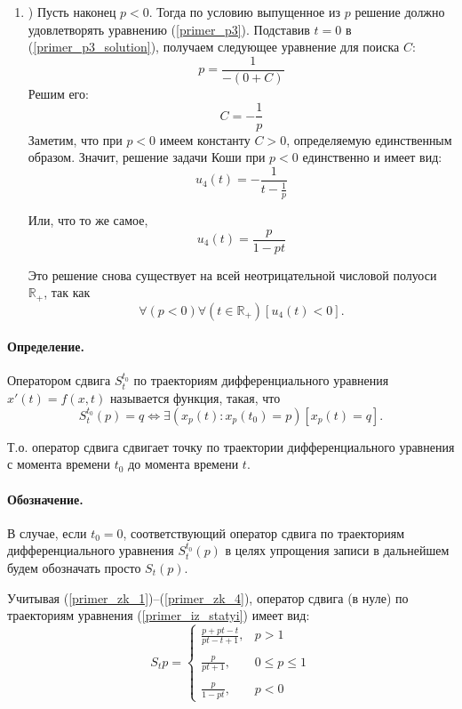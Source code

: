 \begin{enumerate}
\item)
Пусть наконец $p<0$.
Тогда по условию выпущенное из $p$ решение должно удовлетворять уравнению (\ref{primer_p3}).
Подставив $t=0$ в (\ref{primer_p3_solution}), получаем следующее уравнение для поиска $C$:
$$
	p=\frac{1}{-(0+C)}
$$
Решим его:
$$
	C=-\frac{1}{p}
$$
Заметим, что при $p<0$ имеем константу $C>0$, определяемую единственным образом.
Значит, решение задачи Коши при $p<0$ единственно и имеет вид:
\begin{equation}\label{primer_zk_4_0}
	u_4(t)=-\frac{1}{t-\frac{1}{p}}
\end{equation}

Или, что то же самое,
\begin{equation}\label{primer_zk_4}
	u_4(t)=\frac{p}{1-pt}
\end{equation}

Это решение снова существует на всей неотрицательной числовой полуоси $\mathbb{R}_+$, так как
$$
	\forall(p<0)\forall\left(t \in \mathbb{R}_+\right)\left[u_4(t) < 0\right].
$$

\end{enumerate}

\paragraph{Определение.}
Оператором сдвига $S^{t_0}_t$ по траекториям дифференциального уравнения $x'(t) = f(x,t)$ называется функция, такая, что
\begin{equation*}
	S^{t_0}_t (p) = q \Leftrightarrow
		\exists\left(x_p(t) : x_p(t_0) = p\right)\left[x_p(t) = q\right].
\end{equation*}

Т.о. оператор сдвига сдвигает точку по траектории дифференциального уравнения с момента времени $t_0$ до момента времени $t$.

\paragraph{Обозначение.}
В случае, если $t_0=0$, соответствующий оператор сдвига по траекториям дифференциального уравнения $S^{t_0}_t (p)$ в целях упрощения записи  в дальнейшем будем обозначать просто $S_t (p)$.

Учитывая (\ref{primer_zk_1})--(\ref{primer_zk_4}), оператор сдвига (в нуле) по траекториям уравнения (\ref{primer_iz_statyi}) имеет вид:
\begin{equation}\label{oper_sdviga_primer_1}
	S_t p =
	\left\{
		\begin{array}{ll}
			\frac{p+pt-t}{pt-t+1}, & p > 1
		\\\\
			\frac{p}{pt+1},        & 0 \leq p \leq 1
		\\\\
			\frac{p}{1 - pt},      & p < 0
		\end{array}
	\right.
\end{equation}


